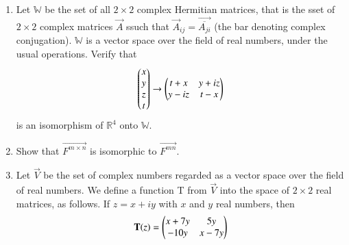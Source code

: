 \begin{enumerate}[label=\thesubsection.\arabic*.,ref=\thesubsection.\theenumi]
\begin{enumerate}
%
%
%
\\
\solution

\end{enumerate}
%
\item Let $\mathbb{W}$ be the set of all $2\times2$ complex Hermitian matrices, that is the sset of $2\times2$ complex matrices $\vec{A}$ ssuch that $\vec{A}_{ij}=\vec{\overline{A_{ji}}}$ (the bar denoting complex conjugation). $\mathbb{W}$ is a vector space over the field of real numbers, under the usual operations. Verify that
\begin{align}\label{iso}
\begin{pmatrix}x\\y\\z\\t\end{pmatrix} \rightarrow \begin{pmatrix}t+x&y+iz\\y-iz&t-x\end{pmatrix}
\end{align}
is an isomorphism of $\mathbb{R}^4$ onto $\mathbb{W}$.
%
\\
\solution

\item Show that $\vec{F^{m\times n}}$ is isomorphic to $\vec{F^{mn}}$.
%
\\
\solution

\item Let $\vec{V}$ be the set of complex numbers regarded as a vector space over the field of real numbers. We define a function T from $\vec{V}$ into the space of $2 \times 2$ real matrices, as follows. If $z = x + iy$ with $x$ and $y$ real numbers, then
\begin{align}
    \mathbf{T}(z) = \begin{pmatrix}x + 7y & 5y \\ -10y & x-7y\end{pmatrix} \nonumber
\end{align}
\begin{enumerate}

\end{enumerate}
\end{enumerate}
